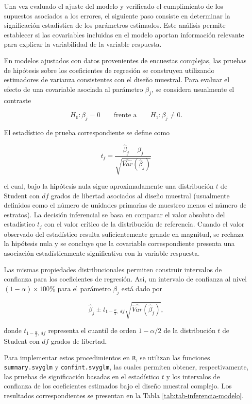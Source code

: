 \documentclass[
  spanish,
  12pt,
]{book}
\begin{document}
Una vez evaluado el ajuste del modelo y verificado el cumplimiento de los supuestos asociados a los errores, el siguiente paso consiste en determinar la significación estadística de los parámetros estimados. Este análisis permite establecer si las covariables incluidas en el modelo aportan información relevante para explicar la variabilidad de la variable respuesta.

En modelos ajustados con datos provenientes de encuestas complejas, las pruebas de hipótesis sobre los coeficientes de regresión se construyen utilizando estimadores de varianza consistentes con el diseño muestral. Para evaluar el efecto de una covariable asociada al parámetro \(\beta_j\), se considera usualmente el contraste

\[
H_0:\beta_j=0
\qquad \text{frente a} \qquad
H_1:\beta_j\neq 0.
\]

El estadístico de prueba correspondiente se define como

\[
t_j=
\frac{\hat{\beta}_{j}-\beta_{j}}
{\sqrt{\widehat{Var}(\hat{\beta}_{j})}}
\]

el cual, bajo la hipótesis nula sigue aproximadamente una distribución \(t\) de Student con \(df\) grados de libertad asociados al diseño muestral (usualmente definidos como el número de unidades primarias de muestreo menos el número de estratos). La decisión inferencial se basa en comparar el valor absoluto del estadístico \(t_j\) con el valor crítico de la distribución de referencia. Cuando el valor observado del estadístico resulta suficientemente grande en magnitud, se rechaza la hipótesis nula y se concluye que la covariable correspondiente presenta una asociación estadísticamente significativa con la variable respuesta.

Las mismas propiedades distribucionales permiten construir intervalos de confianza para los coeficientes de regresión. Así, un intervalo de confianza al nivel \((1-\alpha)\times100\%\) para el parámetro \(\beta_j\) está dado por

\[
\hat{\beta}_{j}
\pm
t_{1-\frac{\alpha}{2},\,df}
\sqrt{\widehat{Var}(\hat{\beta}_{j})},
\]

donde \(t_{1-\frac{\alpha}{2},\,df}\) representa el cuantil de orden \(1-\alpha/2\) de la distribución \(t\) de Student con \(df\) grados de libertad.

Para implementar estos procedimientos en \texttt{R}, se utilizan las funciones \texttt{summary.svyglm} y \texttt{confint.svyglm}, las cuales permiten obtener, respectivamente, las pruebas de significación basadas en el estadístico \(t\) y los intervalos de confianza de los coeficientes estimados bajo el diseño muestral complejo. Los resultados correspondientes se presentan en la Tabla \ref{tab:tab-inferencia-modelo}.
\end{document}
